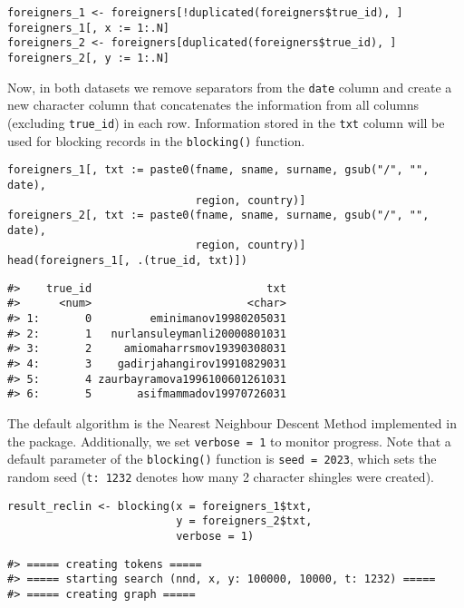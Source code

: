 \begin{verbatim}
foreigners_1 <- foreigners[!duplicated(foreigners$true_id), ]
foreigners_1[, x := 1:.N]
foreigners_2 <- foreigners[duplicated(foreigners$true_id), ]
foreigners_2[, y := 1:.N]
\end{verbatim}

Now, in both datasets we remove separators from the \texttt{date} column and
create a new character column that concatenates the information from all
columns (excluding \texttt{true\_id}) in each row. Information stored in the \texttt{txt}
column will be used for blocking records in the \texttt{blocking()} function.

\begin{verbatim}
foreigners_1[, txt := paste0(fname, sname, surname, gsub("/", "", date), 
                             region, country)]
foreigners_2[, txt := paste0(fname, sname, surname, gsub("/", "", date), 
                             region, country)]
head(foreigners_1[, .(true_id, txt)])
\end{verbatim}

\begin{verbatim}
#>    true_id                           txt
#>      <num>                        <char>
#> 1:       0         eminimanov19980205031
#> 2:       1   nurlansuleymanli20000801031
#> 3:       2     amiomaharrsmov19390308031
#> 4:       3    gadirjahangirov19910829031
#> 5:       4 zaurbayramova1996100601261031
#> 6:       5       asifmammadov19970726031
\end{verbatim}

The default algorithm is the Nearest Neighbour Descent Method \citep{Dong2011} implemented in
the  package. Additionally, we set \texttt{verbose\ =\ 1} to monitor progress. Note
that a default parameter of the \texttt{blocking()} function is \texttt{seed\ =\ 2023},
which sets the random seed (\texttt{t:\ 1232} denotes how many 2 character shingles were created).

\begin{verbatim}
result_reclin <- blocking(x = foreigners_1$txt,
                          y = foreigners_2$txt,
                          verbose = 1)
\end{verbatim}

\begin{verbatim}
#> ===== creating tokens =====
#> ===== starting search (nnd, x, y: 100000, 10000, t: 1232) =====
#> ===== creating graph =====
\end{verbatim}

